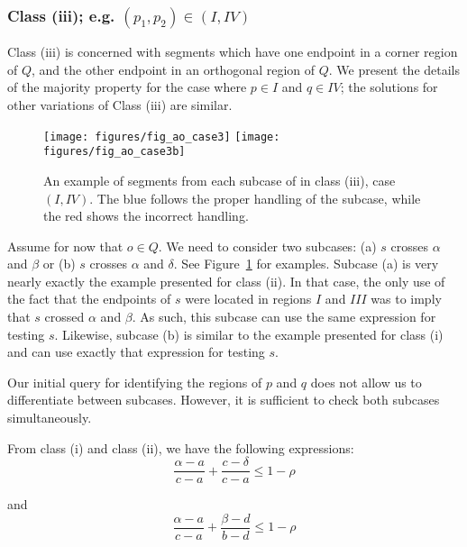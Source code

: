 \subsubsection*{Class (iii); e.g. $(p_1, p_2) \in (I, IV)$}
\label{:rectanges:ao:class3}

Class (iii) is concerned with segments which have one endpoint in a corner region of $Q$, and the other endpoint in an orthogonal region of $Q$. We present the details of the majority property for the case where $p \in I$ and $q \in IV$; the solutions for other variations of Class (iii) are similar.

\begin{figure}[t]
\begin{center}
  \texttt{[image: figures/fig\_ao\_case3]}
  \hspace{1.0em}
  \texttt{[image: figures/fig\_ao\_case3b]}
  \caption[An example of a segment in class (iii), case $(I, IV)$.]{An example of segments from each subcase of in class (iii), case $(I, IV)$. The blue follows the proper handling of the subcase, while the red shows the incorrect handling.}
  \label{fig:rectangles:ao:case3}
\end{center}
\end{figure}

Assume for now that $o \in Q$. We need to consider two subcases: (a) $s$ crosses $\alpha$ and $\beta$ or (b) $s$ crosses $\alpha$ and $\delta$. See Figure~\ref{fig:rectangles:ao:case3} for examples. Subcase (a) is very nearly exactly the example presented for class (ii). In that case, the only use of the fact that the endpoints of $s$ were located in regions $I$ and $III$ was to imply that $s$ crossed $\alpha$ and $\beta$. As such, this subcase can use the same expression for testing $s$. Likewise, subcase (b) is similar to the example presented for class (i) and can use exactly that expression for testing $s$.

Our initial query for identifying the regions of $p$ and $q$ does not allow us to differentiate between subcases. However, it is sufficient to check both subcases simultaneously.

From class (i) and class (ii), we have the following expressions:
\[ 
\frac{\alpha - a}{c - a} + \frac{c - \delta}{c - a} \leq 1 - \rho
\]

\noindent and
\[ 
\frac{\alpha - a}{c - a} + \frac{\beta - d}{b - d} \leq 1 - \rho
\]

